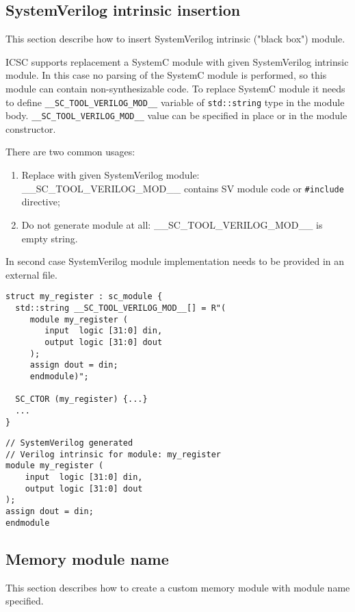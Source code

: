 
\subsection{SystemVerilog intrinsic insertion}\label{section:black_box}

This section describe how to insert SystemVerilog intrinsic ("black box") module.

ICSC supports replacement a SystemC module with given SystemVerilog intrinsic module. In this case no parsing of the SystemC module is performed, so this module can contain non-synthesizable code. To replace SystemC module it needs to define {\tt \_\_SC\_TOOL\_VERILOG\_MOD\_\_} variable of {\tt std::string} type in the module body.
{\tt \_\_SC\_TOOL\_VERILOG\_MOD\_\_} value can be specified in place or in the module constructor.

There are two common usages:
\begin{enumerate}
\item Replace with given SystemVerilog module: \_\_SC\_TOOL\_VERILOG\_MOD\_\_ contains SV module code or {\tt \#include} directive;
\item Do not generate module at all: \_\_SC\_TOOL\_VERILOG\_MOD\_\_ is empty string. 
\end{enumerate}
%
In second case SystemVerilog module implementation needs to be provided in an external file.

\begin{lstlisting}[style=mycpp]
struct my_register : sc_module {
  std::string __SC_TOOL_VERILOG_MOD__[] = R"(
     module my_register (
        input  logic [31:0] din,
        output logic [31:0] dout
     );
     assign dout = din;
     endmodule)";

  SC_CTOR (my_register) {...}
  ...
}
\end{lstlisting}
%
\begin{lstlisting}[style=mycpp]
// SystemVerilog generated
// Verilog intrinsic for module: my_register 
module my_register (
    input  logic [31:0] din,
    output logic [31:0] dout
);
assign dout = din;
endmodule
\end{lstlisting}



\subsection{Memory module name}

This section describes how to create a custom memory module with module name specified. 

